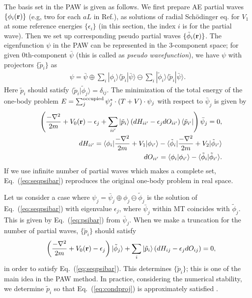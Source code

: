 \documentclass[a4paper,10pt,aip,onecolumn,amsmath,amssymb,floatfix,rmp]{revtex4-1}
\newcommand{\bfr}{{\bf r}}
\def\tphi{{\tilde{\phi}}}
\newcommand{\req}[1]{\mbox{Eq.~\!(\ref{#1})}}
\begin{document}
The basis set in the PAW is given as follows.
We first prepare AE partial waves
$\{\phi_i(\bfr)\}$ (e.g, two for each $aL$ in Ref.),
as solutions of radial Sch\"odinger eq. for $V_1$ at some reference 
energies $\{\epsilon_i\}$ (in this section, the index $i$ is for the
partial wave). Then we set up corresponding
pseudo partial waves $\{\tilde{\phi}_i(\bfr)\}$.
The eigenfunction $\psi$ in the PAW can be represented 
in the 3-component space; for given 0th-component $\bar{\psi}$
(this is called as {\it pseudo wavefunction}), we have
$\psi$ with projectors $\{\tilde{p}_i\}$ as
\begin{eqnarray}
\psi=\bar{\psi}
\oplus \sum_i |\phi_i\rangle \langle \tilde{p}_i|\bar{\psi}\rangle
\ominus \sum_i |\tilde{\phi}_i \rangle \langle
\tilde{p}_i|\bar{\psi}\rangle.
\label{eq:psibar}
\end{eqnarray}
Here $\tilde{p}_i$ should satisfy
$\langle \tilde{p}_i|\tilde{\phi}_j \rangle=\delta_{ij}$.
The minimization of the total energy of the one-body problem 
$E= \sum_j^{\rm occupied} \psi_j^* \cdot (T+V) \cdot \psi_j$
with respect to $\bar{\psi}_j$ is given by
\begin{eqnarray}
&&\left( \frac{-\nabla^2}{2m}+V_0(\bfr)-\epsilon_j +
 \sum_{ii'}  
  |\tilde{p}_i \rangle  
   \left(dH_{ii'}-\epsilon_j dO_{ii'} \right)  
  \langle \tilde{p}_{i'}| 
\right) \bar{\psi}_j=0, \label{eq:seqpsibar}\\
&&dH_{ii'}= \langle \phi_i| \frac{-\nabla^2}{2m}+V_1|\phi_{i'}\rangle  
 -  \langle \tphi_i| \frac{-\nabla^2}{2m}+V_2|\tphi_{i'}\rangle \\
&&dO_{ii'}= \langle \phi_i|\phi_{i'}\rangle  
 -  \langle \tphi_i| \tphi_{i'}\rangle.
\end{eqnarray}
If we use infinite number of partial waves which makes a complete set, 
\req{eq:seqpsibar} reproduces the original one-body problem in real space.

Let us consider a case where
$\psi_j=\bar{\psi}_j \oplus \phi_j\ominus\tphi_j$
is the solution of \req{eq:seqpsibar} with eigenvalue $\epsilon_j$,
where $\bar{\psi}_j$ within MT coincides with $\tphi_j$.
This is given by \req{eq:psibar} from $\bar{\psi}_j$.
When we make a truncation for the number of partial waves,
$\{\tilde{p}_i\}$ should satisfy 
\begin{eqnarray}
&& \left( \frac{-\nabla^2}{2m}+V_0(\bfr)-\epsilon_j \right)|\tphi_j \rangle
 + \sum_i |\tilde{p}_i \rangle  
   \left(dH_{ij}-\epsilon_j dO_{ij} \right)  =0, \label{eq:condproj}
\end{eqnarray}
in order to satisfy \req{eq:seqpsibar}.
This determines $\{\tilde{p}_i\}$; this is one of the main idea in the PAW method. 
In practice, considering the numerical stability, 
we determine  $\tilde{p}_i$ so that \req{eq:condproj} is approximately
satisfied \cite{PAW}. 
\end{document}
